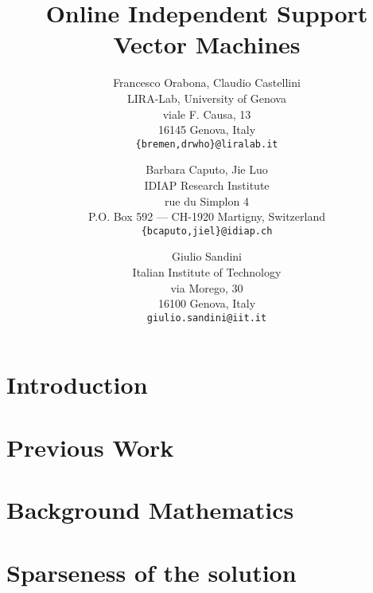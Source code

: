 \documentclass[10pt,twocolumn,letterpaper]{article}
\begin{document}

\title{Online Independent Support Vector Machines}

\author{
Francesco Orabona, Claudio Castellini\\
LIRA-Lab, University of Genova\\
viale F. Causa, 13\\
16145 Genova, Italy\\
{\tt\small \{bremen,drwho\}@liralab.it}
\and
Barbara Caputo, Jie Luo\\
IDIAP Research Institute\\
rue du Simplon 4\\
P.O. Box 592 --- CH-1920 Martigny, Switzerland\\
{\tt\small \{bcaputo,jiel\}@idiap.ch}
\and
Giulio Sandini\\
Italian Institute of Technology\\
via Morego, 30\\
16100 Genova, Italy\\
{\tt\small giulio.sandini@iit.it}
}

\maketitle


\begin{abstract}
  
\end{abstract}

\section{Introduction}
\label{introduction}


\section{Previous Work}
\label{prev-work}


\section{Background Mathematics}
\label{sec:bg}


\section{Sparseness of the solution}
\label{sec:spars}

\end{document}
